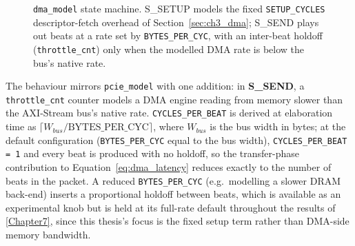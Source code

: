 \begin{figure}[htbp]
\centering
{}
\caption{\texttt{dma\_model} state machine. S\_SETUP models the fixed \texttt{SETUP\_CYCLES} descriptor-fetch overhead of Section~\ref{sec:ch3_dma}; S\_SEND plays out beats at a rate set by \texttt{BYTES\_PER\_CYC}, with an inter-beat holdoff (\texttt{throttle\_cnt}) only when the modelled DMA rate is below the bus's native rate.}
\label{fig:dma_fsm}
\end{figure}

The behaviour mirrors \texttt{pcie\_model} with one addition: in \textbf{S\_SEND}, a \texttt{throttle\_cnt} counter models a DMA engine reading from memory slower than the AXI-Stream bus's native rate. \texttt{CYCLES\_PER\_BEAT} is derived at elaboration time as $\lceil W_{bus} / \text{BYTES\_PER\_CYC} \rceil$, where $W_{bus}$ is the bus width in bytes; at the default configuration (\texttt{BYTES\_PER\_CYC} equal to the bus width), \texttt{CYCLES\_PER\_BEAT = 1} and every beat is produced with no holdoff, so the transfer-phase contribution to Equation~\ref{eq:dma_latency} reduces exactly to the number of beats in the packet. A reduced \texttt{BYTES\_PER\_CYC} (e.g.\ modelling a slower DRAM back-end) inserts a proportional holdoff between beats, which is available as an experimental knob but is held at its full-rate default throughout the results of \autoref{Chapter7}, since this thesis's focus is the fixed setup term rather than DMA-side memory bandwidth.

